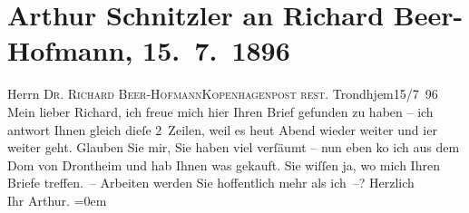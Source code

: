

               \section[Arthur Schnitzler an Richard Beer-Hofmann, 15. 7. 1896]{ Arthur Schnitzler an Richard Beer-Hofmann, 15. 7. 1896}\nopagebreak{}\rehead{ }\begin{ledgroupsized}[t]{13cm}\normalsize\beginnumbering{} \toendnotes[C]{\smallbreak\pagebreak[2]} 
\pstart{}{\pb}Herrn \textsc{Dr. Richard
                     Beer-Hofmann}\pend{}\pstart{}\textsc{Kopenhagen}\pend{}\pstart{}\textsc{post rest.}\pend{}{\bigskip}\pstart
           \raggedleft{}{\pb}Trondhjem15/7 96\pend
           \pstart
           Mein lieber Richard, ich freue mich hier Ihren Brief gefunden zu
               haben – ich antwort Ihnen gleich dieſe 2 Zeilen, weil es heut Abend wieder weiter und
                  i{\geminationm}er weiter geht. Glauben Sie mir, Sie haben viel
               verſäumt – nun eben ko{\geminationm} ich aus dem Dom von Drontheim und hab Ihnen was gekauft.\pend
           \pstart
           Sie wiſſen ja, wo mich Ihren Briefe treffen. – Arbeiten werden Sie hoffentlich mehr
               als ich –?\pend
           \pstart
           Herzlich{\\[\baselineskip]}Ihr \spacefill\mbox{Arthur.}\pend
           \leftskip=0em{}          \endnumbering{}\end{ledgroupsized}  \newcommand{\dateiname}{L00563}\newcommand{\titel}{Arthur Schnitzler an Richard Beer-Hofmann, 15. 7. 1896}\newcommand{\editorInnen}{Martin Anton Müller und Gerd-Hermann Susen}
      